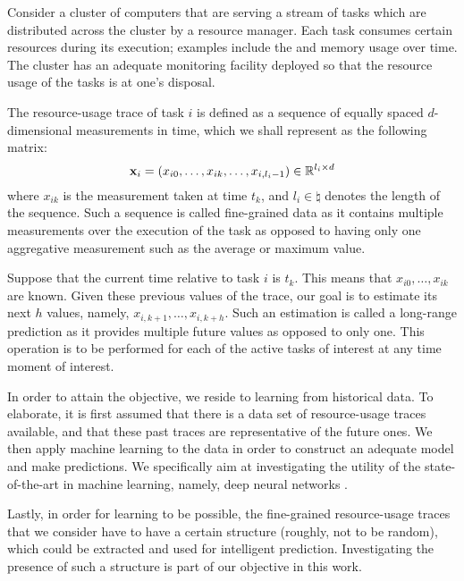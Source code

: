 Consider a cluster of computers that are serving a stream of tasks which are
distributed across the cluster by a resource manager. Each task consumes certain
resources during its execution; examples include the  and memory usage
over time. The cluster has an adequate monitoring facility deployed so that the
resource usage of the tasks is at one's disposal.

The resource-usage trace of task $i$ is defined as a sequence of equally spaced
$d$-dimensional measurements in time, which we shall represent as the following
matrix:
\[
  \mathbf{x}_i = \left(x_{i0}, \dots, x_{ik}, \dots, x_{i,l_i - 1}\right) \in \mathbb{R}^{l_i \times d}
\]
where $x_{ik}$ is the measurement taken at time $t_k$, and $l_i \in \natural$
denotes the length of the sequence. Such a sequence is called fine-grained data
as it contains multiple measurements over the execution of the task as opposed
to having only one aggregative measurement such as the average or maximum value.

Suppose that the current time relative to task $i$ is $t_k$. This means that
$x_{i0}, \dots, x_{ik}$ are known. Given these previous values of the trace, our
goal is to estimate its next $h$ values, namely, $x_{i,k + 1}, \dots, x_{i,k +
h}$. Such an estimation is called a long-range prediction as it provides
multiple future values as opposed to only one. This operation is to be performed
for each of the active tasks of interest at any time moment of interest.

In order to attain the objective, we reside to learning from historical data. To
elaborate, it is first assumed that there is a data set of resource-usage traces
available, and that these past traces are representative of the future ones. We
then apply machine learning \cite{hastie2009} to the data in order to construct
an adequate model and make predictions. We specifically aim at investigating the
utility of the state-of-the-art in machine learning, namely, deep neural
networks \cite{goodfellow2016}.

Lastly, in order for learning to be possible, the fine-grained resource-usage
traces that we consider have to have a certain structure (roughly, not to be
random), which could be extracted and used for intelligent prediction.
Investigating the presence of such a structure is part of our objective in this
work.
